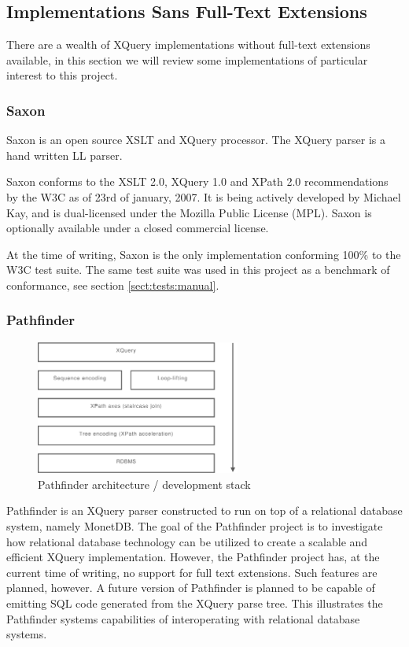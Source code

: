 \subsection{Implementations Sans Full-Text Extensions}
There are a wealth of XQuery implementations without full-text
extensions available, in this section we will review some implementations of
particular interest to this project.

\subsubsection{Saxon}
Saxon is an open source XSLT and XQuery processor. The XQuery parser is a hand
written LL parser.

Saxon conforms to the XSLT 2.0, XQuery 1.0 and XPath 2.0 recommendations
by the W3C as of 23rd of january, 2007. It is being actively
developed by Michael Kay, and is dual-licensed under the Mozilla Public License
(MPL). Saxon is optionally available under a closed commercial license.

At the time of writing, Saxon is the only implementation conforming 100\% to
the W3C test suite\cite{w3ctestresults}. The same test suite was used in this
project as a benchmark of conformance, see section \ref{sect:tests:manual}.

\subsubsection{Pathfinder}
\label{sect:soa:pathfinder}
\begin{figure}[!h]
  \centering
    \includegraphics[width=0.6\textwidth]{diagrams/pathfinder_arch}
  \caption{Pathfinder architecture / development stack}
\end{figure}

Pathfinder\cite{pathfinderHome} is an XQuery parser constructed to run on top of a relational
database system, namely MonetDB. The goal of the Pathfinder project is to
investigate how relational database technology can be utilized to create a
scalable and efficient XQuery implementation. However, the Pathfinder project
has, at the current time of writing, no support for full text extensions. Such
features are planned, however. A future version of Pathfinder is planned to be
capable of emitting SQL code generated from the XQuery parse tree. This
illustrates the Pathfinder systems capabilities of interoperating with
relational database systems.

